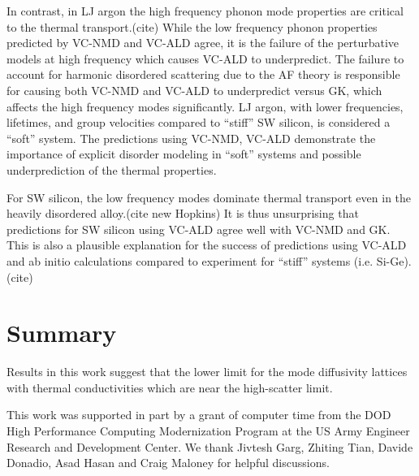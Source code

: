 \documentclass[aps,prb,twocolumn,superscriptaddress,amsmath,amssymb,floatfix]{revtex4}
\begin{document}
In contrast, 
in LJ argon the high frequency phonon mode properties are critical 
to the thermal transport.(cite)  
While the low frequency phonon properties predicted by VC-NMD and 
VC-ALD agree, it is the failure of the perturbative models at 
high frequency which causes VC-ALD to underpredict. The failure 
to account for harmonic disordered scattering due to the AF theory 
is responsible for causing both VC-NMD and VC-ALD to underpredict 
versus GK, which affects the high frequency modes significantly. 
LJ argon, with lower 
frequencies, lifetimes, and group velocities compared to 
``stiff'' SW silicon, 
is considered a ``soft'' system. The predictions using 
VC-NMD, VC-ALD demonstrate the importance of explicit disorder 
modeling in ``soft'' systems and possible underprediction 
of the thermal properties.\cite{tian_phonon_2012}

For SW silicon, the low frequency modes dominate thermal transport 
even in the heavily disordered alloy.(cite new Hopkins) 
It is thus unsurprising that predictions for 
SW silicon using VC-ALD agree well with VC-NMD and GK. This is also a 
plausible explanation for the success of predictions using 
VC-ALD and ab initio calculations compared to experiment for 
``stiff'' systems (i.e. Si-Ge).(cite)

\section{\label{S:}Summary}

Results in this work suggest that the lower limit for the mode diffusivity 
lattices with thermal conductivities which are near the 
high-scatter limit.

\begin{acknowledgements}
This work was supported in part by a grant of computer time from the DOD 
High Performance Computing Modernization Program at the US Army Engineer 
Research and Development Center. 
We thank Jivtesh Garg, Zhiting Tian, Davide Donadio, 
Asad Hasan and Craig Maloney for helpful discussions.
\end{acknowledgements}

\appendix

\end{document}
